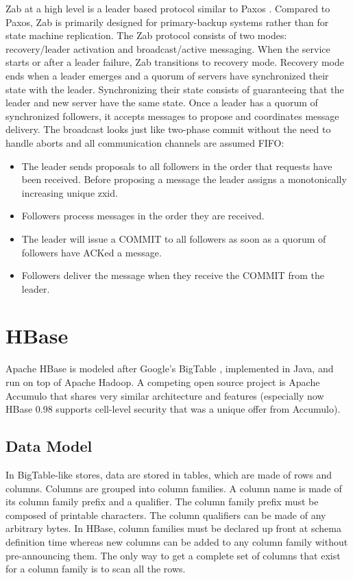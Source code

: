\documentclass[12pt]{book}
\begin{document}
Zab at a high level is a leader based protocol similar to Paxos \cite{Lamport:1998:PP}. Compared to Paxos, Zab is primarily designed for primary-backup systems rather than for state machine replication.
The Zab protocol consists of two modes: recovery/leader activation and broadcast/active messaging. When the service starts or after a leader failure, Zab transitions to recovery mode. Recovery mode ends when a leader emerges and a quorum of servers have synchronized their state with the leader. Synchronizing their state consists of guaranteeing that the leader and new server have the same state.
Once a leader has a quorum of synchronized followers, it accepts messages to propose and coordinates message delivery. The broadcast looks just like two-phase commit \cite{opac:2009} without the need to handle aborts and all communication channels are assumed FIFO:
\begin{itemize}
\item The leader sends proposals to all followers in the order that requests have been received. Before proposing a message the leader assigns a monotonically increasing unique zxid.
\item Followers process messages in the order they are received.
\item The leader will issue a COMMIT to all followers as soon as a quorum of followers have ACKed a message.
\item Followers deliver the message when they receive the COMMIT from the leader.
\end{itemize}

\section[HBase]
{HBase}
Apache HBase \cite{HBase} is modeled after Google's BigTable \cite{Chang:2006:BDS}, implemented in Java, and run on top of Apache Hadoop. A competing open source project is Apache Accumulo \cite{Accumulo} that shares very similar architecture and features (especially now HBase 0.98 supports cell-level security that was a unique offer from Accumulo).

\subsection{Data Model}

In BigTable-like stores, data are stored in tables, which are made of rows and columns. Columns are grouped into column families. A column name is made of its column family prefix and a qualifier. The column family prefix must be composed of printable characters. The column qualifiers can be made of any arbitrary bytes. In HBase, column families must be declared up front at schema definition time whereas new columns can be added to any column family without pre-announcing them. The only way to get a complete set of columns that exist for a column family is to scan all the rows.
\end{document}
